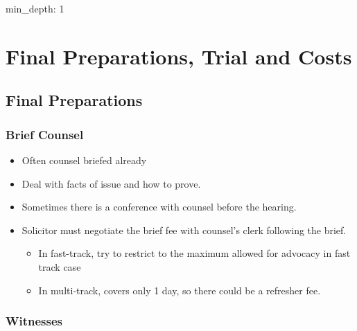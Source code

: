 \documentclass[
]{article}
\author{}
\date{}
\newenvironment{Shaded}{}{}
\newcommand{\NormalTok}[1]{#1}
\providecommand{\tightlist}{%
  \setlength{\itemsep}{0pt}\setlength{\parskip}{0pt}}
\begin{document}
{
\setcounter{tocdepth}{3}
\tableofcontents
}
\begin{Shaded}
\begin{Highlighting}[]
\NormalTok{min\_depth: 1}
\end{Highlighting}
\end{Shaded}

\hypertarget{final-preparations-trial-and-costs}{%
\section{Final Preparations, Trial and
Costs}\label{final-preparations-trial-and-costs}}

\hypertarget{final-preparations}{%
\subsection{Final Preparations}\label{final-preparations}}

\hypertarget{brief-counsel}{%
\subsubsection{Brief Counsel}\label{brief-counsel}}

\begin{itemize}
\tightlist
\item
  Often counsel briefed already
\item
  Deal with facts of issue and how to prove.
\item
  Sometimes there is a conference with counsel before the hearing.
\item
  Solicitor must negotiate the brief fee with counsel's clerk following
  the brief.

  \begin{itemize}
  \tightlist
  \item
    In fast-track, try to restrict to the maximum allowed for advocacy
    in fast track case
  \item
    In multi-track, covers only 1 day, so there could be a refresher
    fee.
  \end{itemize}
\end{itemize}

\hypertarget{witnesses}{%
\subsubsection{Witnesses}\label{witnesses}}
\end{document}
